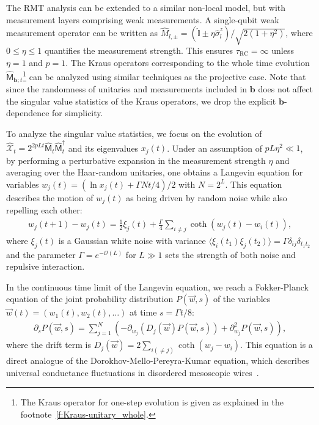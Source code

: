 \documentclass[preprint,pteplogo]{ptephy_v2}%
\numberwithin{equation}{section}
\theoremstyle{definition}
\begin{document}
The RMT analysis can be extended to a similar non-local model, but with measurement layers comprising weak measurements.
A single-qubit weak measurement operator can be written as $\hat{M}_{l, \pm}=(\hat{\mathbb{I}}\pm\eta \hat{\sigma}^z_l)/\sqrt{2(1+\eta^2)}$, where $0\leq\eta\leq1$ quantifies the measurement strength.
This ensures $\tau_\mathrm{RC}=\infty$ unless $\eta=1$ and $p=1$.
The Kraus operators corresponding to the whole time evolution $\hat{\mathsf{M}}_{\bm{b};t}$\footnote{
The Kraus operator for one-step evolution is given as explained in the footnote~\ref{f:Kraus-unitary_whole}.
} can be analyzed using similar techniques as the projective case.
Note that since the randomness of unitaries and measurements included in $\bm{b}$ does not affect the singular value statistics of the Kraus operators, we drop the explicit $\bm{b}$-dependence for simplicity.

To analyze the singular value statistics, we focus on the evolution of $\hat{\mathcal{X}}_{t} = 2^{2pLt}\hat{\mathsf{M}}_{t}\hat{\mathsf{M}}^\dagger_{t}$ and its eigenvalues $x_{j}(t)$.
Under an assumption of $pL\eta^2\ll1$, by performing a perturbative expansion in the measurement strength $\eta$ and averaging over the Haar-random unitaries, one obtains a Langevin equation for variables $w_{j}(t)=(\ln x_{j}(t) + \Gamma Nt /4)/2$ with $N=2^L$.
This equation describes the motion of $w_j(t)$ as being driven by random noise while also repelling each other:
\begin{align}
    w_{j}(t+1) - w_{j}(t) = \frac{1}{2}\xi_j(t) + \frac{\Gamma}{4}\sum_{i\neq j}\coth(w_{j}(t) - w_{i}(t)),
    \label{eq:dynamics_w}
\end{align}
where $\xi_j(t)$ is a Gaussian white noise with variance $\langle \xi_i(t_1)\xi_j(t_2)\rangle = \Gamma \delta_{ij}\delta_{t_1t_2}$ and the parameter $\Gamma = e^{-\mathcal{O}(L)}$ for $L\gg1$ sets the strength of both noise and repulsive interaction.

In the continuous time limit of the Langevin equation, we reach a Fokker-Planck equation of the joint probability distribution $P(\vec{w}, s)$ of the variables $\vec{w}(t)=(w_1(t), w_2(t),\ldots)$ at time $s=\Gamma t/8$:
\begin{align}
    \partial_s P(\vec{w},s) = \sum_{j=1}^{N}(-\partial_{w_j}(D_j(\vec{w}) P(\vec{w},s)) + \partial_{w_j}^2 P(\vec{w},s)),
\end{align}
where the drift term is $D_j(\vec{w}) = 2\sum_{i(\neq j)}\coth(w_j-w_i)$.
This equation is a direct analogue of the Dorokhov-Mello-Pereyra-Kumar equation, which describes universal conductance fluctuations in disordered mesoscopic wires~\cite{dorokhov1982transmission, Mello1988macroscopic}.
\end{document}
